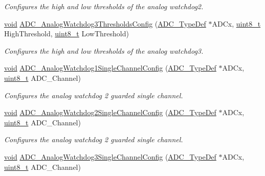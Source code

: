 \begin{DoxyCompactItemize}
\begin{DoxyCompactList}\small\item\em Configures the high and low thresholds of the analog watchdog2. \end{DoxyCompactList}\item 
\hyperlink{group___n_a_m_e_ga18028b8badbf1ea7e704ccac3c488e82}{void} \hyperlink{group___a_d_c___group2_ga91a42302f54ef2ff3a8dac610552a09f}{A\-D\-C\-\_\-\-Analog\-Watchdog3\-Thresholds\-Config} (\hyperlink{struct_a_d_c___type_def}{A\-D\-C\-\_\-\-Type\-Def} $\ast$A\-D\-Cx, \hyperlink{stdint_8h_aba7bc1797add20fe3efdf37ced1182c5}{uint8\-\_\-t} High\-Threshold, \hyperlink{stdint_8h_aba7bc1797add20fe3efdf37ced1182c5}{uint8\-\_\-t} Low\-Threshold)
\begin{DoxyCompactList}\small\item\em Configures the high and low thresholds of the analog watchdog3. \end{DoxyCompactList}\item 
\hyperlink{group___n_a_m_e_ga18028b8badbf1ea7e704ccac3c488e82}{void} \hyperlink{group___a_d_c___group2_gabbb363d51e4e9619d0dc56ec8aea4eca}{A\-D\-C\-\_\-\-Analog\-Watchdog1\-Single\-Channel\-Config} (\hyperlink{struct_a_d_c___type_def}{A\-D\-C\-\_\-\-Type\-Def} $\ast$A\-D\-Cx, \hyperlink{stdint_8h_aba7bc1797add20fe3efdf37ced1182c5}{uint8\-\_\-t} A\-D\-C\-\_\-\-Channel)
\begin{DoxyCompactList}\small\item\em Configures the analog watchdog 2 guarded single channel. \end{DoxyCompactList}\item 
\hyperlink{group___n_a_m_e_ga18028b8badbf1ea7e704ccac3c488e82}{void} \hyperlink{group___a_d_c___group2_gabb97230a71c5946b5be2eb0cd90b4c82}{A\-D\-C\-\_\-\-Analog\-Watchdog2\-Single\-Channel\-Config} (\hyperlink{struct_a_d_c___type_def}{A\-D\-C\-\_\-\-Type\-Def} $\ast$A\-D\-Cx, \hyperlink{stdint_8h_aba7bc1797add20fe3efdf37ced1182c5}{uint8\-\_\-t} A\-D\-C\-\_\-\-Channel)
\begin{DoxyCompactList}\small\item\em Configures the analog watchdog 2 guarded single channel. \end{DoxyCompactList}\item 
\hyperlink{group___n_a_m_e_ga18028b8badbf1ea7e704ccac3c488e82}{void} \hyperlink{group___a_d_c___group2_gaa2b6ac9933fb3d68cf83791afc555427}{A\-D\-C\-\_\-\-Analog\-Watchdog3\-Single\-Channel\-Config} (\hyperlink{struct_a_d_c___type_def}{A\-D\-C\-\_\-\-Type\-Def} $\ast$A\-D\-Cx, \hyperlink{stdint_8h_aba7bc1797add20fe3efdf37ced1182c5}{uint8\-\_\-t} A\-D\-C\-\_\-\-Channel)

\end{DoxyCompactItemize}
